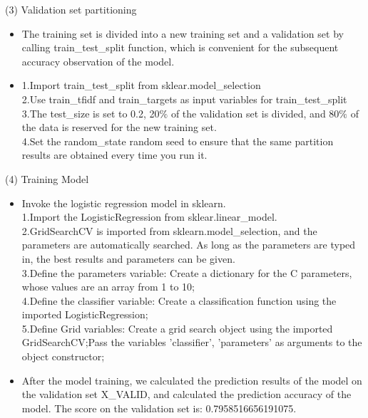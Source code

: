 (3)  Validation set partitioning
\begin{itemize} 
  \item The training set is divided into a new training set and a validation set by calling train_test_split function, which is convenient for the subsequent accuracy observation of the model.
  \item 1.Import train_test_split from sklear.model_selection\\
     2.Use train_tfidf and train_targets as input variables for train_test_split\\
     3.The test_size is set to 0.2, 20$\%$ of the validation set is divided, and 80$\%$ of the data is reserved for the new training set.\\
     4.Set the random_state random seed to ensure that the same partition results are obtained every time you run it.\\
\end{itemize}
(4) Training Model
\begin{itemize} 
       \item Invoke the logistic regression model in sklearn.\\
        1.Import the LogisticRegression from sklear.linear_model.\\
        2.GridSearchCV is imported from sklearn.model_selection, and the parameters are automatically searched. As long as the parameters are typed in, the best results and parameters can be given.\\
        3.Define the parameters variable: Create a dictionary for the C parameters, whose values are an array from 1 to 10;\\
        4.Define the classifier variable: Create a classification function using the imported LogisticRegression;\\
        5.Define Grid variables: Create a grid search object using the imported GridSearchCV;Pass the variables 'classifier', 'parameters' as arguments to the object constructor;
      \item After the model training, we calculated the prediction results of the model on the validation set X_VALID, and calculated the prediction accuracy of the model.
        The score on the validation set is: 0.7958516656191075.\\
\end{itemize}
 
